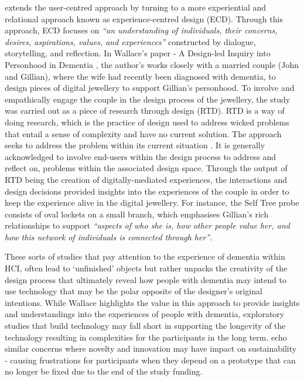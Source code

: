 \cite{wallace_design-led_2013} extends the user-centred approach by turning to a more experiential and relational approach known as experience-centred design (ECD). Through this approach, ECD focuses on \textit{``an understanding of individuals, their concerns, desires, aspirations, values, and experiences''} \citep{morrissey_value_2017} constructed by dialogue, storytelling, and reflection. In Wallace's paper - A Design-led Inquiry into Personhood in Dementia \citep{wallace_design-led_2013}, the author's works closely with a married couple (John and Gillian), where the wife had recently been diagnosed with dementia, to design pieces of digital jewellery to support Gillian's personhood. To involve and empathically engage the couple in the design process of the jewellery, the study was carried out as a piece of research through design (RTD). RTD is a way of doing research, which is the practice of design used to address wicked problems that entail a sense of complexity and have no current solution. The approach seeks to address the problem within its current situation \citep{zimmerman_research_2007}. It is generally acknowledged to involve end-users within the design process to address and reflect on, problems within the associated design space. Through the output of RTD being the creation of digitally-mediated experiences, the interactions and design decisions provided \cite{wallace_design-led_2013} insights into the experiences of the couple in order to keep the experience alive in the digital jewellery. For instance, the Self Tree probe consists of oval lockets on a small branch, which emphasises Gillian's rich relationships to support \textit{``aspects of who she is, how other people value her, and how this network of individuals is connected through her''}.

These sorts of studies that pay attention to the experience of dementia within HCI, often lead to `unfinished' objects but rather unpacks the creativity of the design process that ultimately reveal how people with dementia may intend to use technology that may be the polar opposite of the designer's original intentions. While Wallace highlights the value in this approach to provide insights and understandings into the experiences of people with dementia, exploratory studies that build technology may fall short in supporting the longevity of the technology resulting in complexities for the participants in the long term. \cite{meurer_designing_2018} echo similar concerns where novelty and innovation may have impact on sustainability - causing frustrations for participants when they depend on a prototype that can no longer be fixed due to the end of the study funding.

